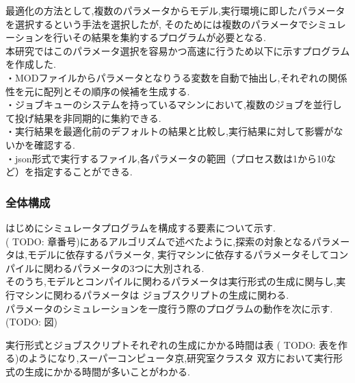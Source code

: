 最適化の方法として,複数のパラメータからモデル,実行環境に即したパラメータを選択するという手法を選択したが,
そのためには複数のパラメータでシミュレーションを行いその結果を集約するプログラムが必要となる.\\
本研究ではこのパラメータ選択を容易かつ高速に行うため以下に示すプログラムを作成した.\\
・MODファイルからパラメータとなりうる変数を自動で抽出し,それぞれの関係性を元に配列とその順序の候補を生成する.\\
・ジョブキューのシステムを持っているマシンにおいて,複数のジョブを並行して投げ結果を非同期的に集約できる.\\
・実行結果を最適化前のデフォルトの結果と比較し,実行結果に対して影響がないかを確認する.\\
・json形式で実行するファイル,各パラメータの範囲（プロセス数は1から10など）を指定することができる.\\
\subsubsection{全体構成}
はじめにシミュレータプログラムを構成する要素について示す.\\
( TODO: 章番号)にあるアルゴリズムで述べたように,探索の対象となるパラメータは,モデルに依存するパラメータ,
実行マシンに依存するパラメータそしてコンパイルに関わるパラメータの3つに大別される.\\
そのうち,モデルとコンパイルに関わるパラメータは実行形式の生成に関与し,実行マシンに関わるパラメータは
ジョブスクリプトの生成に関わる.\\
パラメータのシミュレーションを一度行う際のプログラムの動作を次に示す.\\
 (TODO: 図)


実行形式とジョブスクリプトそれぞれの生成にかかる時間は表 ( TODO: 表を作る)のようになり,スーパーコンピュータ京,研究室クラスタ
双方において実行形式の生成にかかる時間が多いことがわかる.\\


